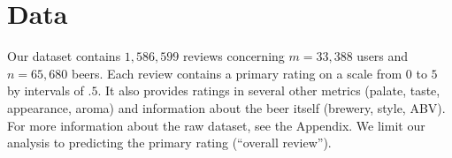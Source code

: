 \documentclass[12pt]{article}
\begin{document}




\section{Data}
Our dataset contains $1,586,599$ reviews concerning $m = 33,388$ users and $n = 65,680$ beers. Each review contains a primary rating on a scale from $0$ to $5$ by intervals of $.5$. It also provides ratings in several other metrics (palate, taste, appearance, aroma) and information about the beer itself (brewery, style, ABV). For more information about the raw dataset, see the Appendix. We limit our analysis to predicting the primary rating (``overall review'').
\end{document}
